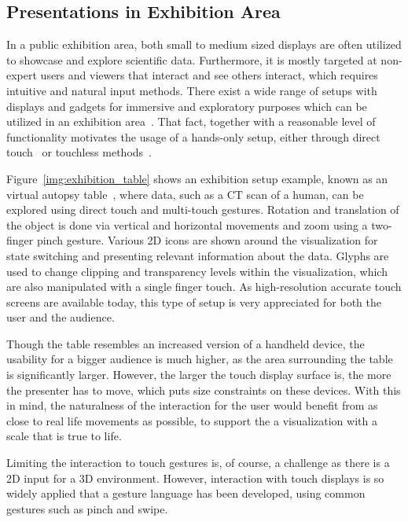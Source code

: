 \documentclass[review,journal]{vgtc}         %
\begin{document}
\subsection{Presentations in Exhibition Area} \label{sec:exhibition}
In a public exhibition area, both small to medium sized displays are often utilized to showcase and explore scientific data.
Furthermore, it is mostly targeted at non-expert users and viewers that interact and see others interact, which requires intuitive and natural input methods.
There exist a wide range of setups with displays and gadgets for immersive and exploratory purposes which can be utilized in an exhibition area~\cite{Laha:2013:VCB:2491367.2491368, conf/egve/KruszynskiL08}.
That fact, together with a reasonable level of functionality motivates the usage of a hands-only setup, either through direct touch~\cite{Klein:2012:DSD:2322389.2322403} or touchless methods~\cite{O'hara:2013:NTP:2442106.2442111}.

Figure~\ref{img:exhibition_table} shows an exhibition setup example, known as an virtual autopsy table~\cite{LRFPY11}, where data, such as a CT scan of a human, can be explored using direct touch and multi-touch gestures.
Rotation and translation of the object is done via vertical and horizontal movements and zoom using a two-finger pinch gesture.
Various 2D icons are shown around the visualization for state switching and presenting relevant information about the data.
Glyphs are used to change clipping and transparency levels within the visualization, which are also manipulated with a single finger touch.
As high-resolution accurate touch screens are available today, this type of setup is very appreciated for both the user and the audience.

Though the table resembles an increased version of a handheld device, the usability for a bigger audience is much higher, as the area surrounding the table is significantly larger.
However, the larger the touch display surface is, the more the presenter has to move, which puts size constraints on these devices.
With this in mind, the naturalness of the interaction for the user would benefit from as close to real life movements as possible, to support the a visualization with a scale that is true to life.

Limiting the interaction to touch gestures is, of course, a challenge as there is a 2D input for a 3D environment.
However, interaction with touch displays is so widely applied that a gesture language has been developed, using common gestures such as pinch and swipe.
\end{document}
